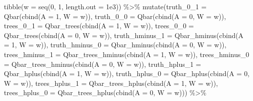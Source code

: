 \documentclass[
  11pt,
  openright,twoside]{book}
\newenvironment{Shaded}{\begin{snugshade}}{\end{snugshade}}
\newcommand{\AttributeTok}[1]{\textcolor[rgb]{0.77,0.63,0.00}{#1}}
\newcommand{\DecValTok}[1]{\textcolor[rgb]{0.00,0.00,0.81}{#1}}
\newcommand{\FloatTok}[1]{\textcolor[rgb]{0.00,0.00,0.81}{#1}}
\newcommand{\FunctionTok}[1]{\textcolor[rgb]{0.00,0.00,0.00}{#1}}
\newcommand{\NormalTok}[1]{#1}
\newcommand{\SpecialCharTok}[1]{\textcolor[rgb]{0.00,0.00,0.00}{#1}}
\theoremstyle{definition}
\theoremstyle{definition}
\theoremstyle{definition}
\theoremstyle{definition}
\theoremstyle{remark}
\begin{document}
\begin{Shaded}
\begin{Highlighting}[]
\FunctionTok{tibble}\NormalTok{(}\AttributeTok{w =} \FunctionTok{seq}\NormalTok{(}\DecValTok{0}\NormalTok{, }\DecValTok{1}\NormalTok{, }\AttributeTok{length.out =} \FloatTok{1e3}\NormalTok{)) }\SpecialCharTok{\%\textgreater{}\%}
  \FunctionTok{mutate}\NormalTok{(}\AttributeTok{truth\_0\_1 =} \FunctionTok{Qbar}\NormalTok{(}\FunctionTok{cbind}\NormalTok{(}\AttributeTok{A =} \DecValTok{1}\NormalTok{, }\AttributeTok{W =}\NormalTok{ w)),}
         \AttributeTok{truth\_0\_0 =} \FunctionTok{Qbar}\NormalTok{(}\FunctionTok{cbind}\NormalTok{(}\AttributeTok{A =} \DecValTok{0}\NormalTok{, }\AttributeTok{W =}\NormalTok{ w)),}
         \AttributeTok{trees\_0\_1 =} \FunctionTok{Qbar\_trees}\NormalTok{(}\FunctionTok{cbind}\NormalTok{(}\AttributeTok{A =} \DecValTok{1}\NormalTok{, }\AttributeTok{W =}\NormalTok{ w)),}
         \AttributeTok{trees\_0\_0 =} \FunctionTok{Qbar\_trees}\NormalTok{(}\FunctionTok{cbind}\NormalTok{(}\AttributeTok{A =} \DecValTok{0}\NormalTok{, }\AttributeTok{W =}\NormalTok{ w)),}
         \AttributeTok{truth\_hminus\_1 =} \FunctionTok{Qbar\_hminus}\NormalTok{(}\FunctionTok{cbind}\NormalTok{(}\AttributeTok{A =} \DecValTok{1}\NormalTok{, }\AttributeTok{W =}\NormalTok{ w)),}
         \AttributeTok{truth\_hminus\_0 =} \FunctionTok{Qbar\_hminus}\NormalTok{(}\FunctionTok{cbind}\NormalTok{(}\AttributeTok{A =} \DecValTok{0}\NormalTok{, }\AttributeTok{W =}\NormalTok{ w)),}
         \AttributeTok{trees\_hminus\_1 =} \FunctionTok{Qbar\_trees\_hminus}\NormalTok{(}\FunctionTok{cbind}\NormalTok{(}\AttributeTok{A =} \DecValTok{1}\NormalTok{, }\AttributeTok{W =}\NormalTok{ w)),}
         \AttributeTok{trees\_hminus\_0 =} \FunctionTok{Qbar\_trees\_hminus}\NormalTok{(}\FunctionTok{cbind}\NormalTok{(}\AttributeTok{A =} \DecValTok{0}\NormalTok{, }\AttributeTok{W =}\NormalTok{ w)),}
         \AttributeTok{truth\_hplus\_1 =} \FunctionTok{Qbar\_hplus}\NormalTok{(}\FunctionTok{cbind}\NormalTok{(}\AttributeTok{A =} \DecValTok{1}\NormalTok{, }\AttributeTok{W =}\NormalTok{ w)),}
         \AttributeTok{truth\_hplus\_0 =} \FunctionTok{Qbar\_hplus}\NormalTok{(}\FunctionTok{cbind}\NormalTok{(}\AttributeTok{A =} \DecValTok{0}\NormalTok{, }\AttributeTok{W =}\NormalTok{ w)),}
         \AttributeTok{trees\_hplus\_1 =} \FunctionTok{Qbar\_trees\_hplus}\NormalTok{(}\FunctionTok{cbind}\NormalTok{(}\AttributeTok{A =} \DecValTok{1}\NormalTok{, }\AttributeTok{W =}\NormalTok{ w)),}
         \AttributeTok{trees\_hplus\_0 =} \FunctionTok{Qbar\_trees\_hplus}\NormalTok{(}\FunctionTok{cbind}\NormalTok{(}\AttributeTok{A =} \DecValTok{0}\NormalTok{, }\AttributeTok{W =}\NormalTok{ w))) }\SpecialCharTok{\%\textgreater{}\%}

\end{Highlighting}
\end{Shaded}
\end{document}
